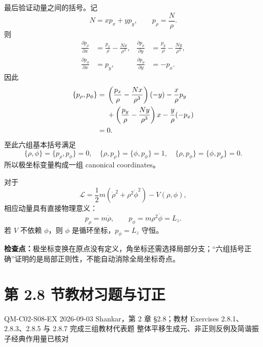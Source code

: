 \begin{checkedsolution}
最后验证动量之间的括号。记
\[
  N=xp_x+yp_y,
  \qquad
  p_\rho=\frac N\rho.
\]
则
\begin{align}
  \frac{\partial p_\rho}{\partial x}
  &=\frac{p_x}{\rho}-\frac{Nx}{\rho^3},
  &
  \frac{\partial p_\rho}{\partial y}
  &=\frac{p_y}{\rho}-\frac{Ny}{\rho^3},
  \label{eq:QM-C02-S07-E02-prho-position-derivatives}\\
  \frac{\partial p_\phi}{\partial x}
  &=p_y,
  &
  \frac{\partial p_\phi}{\partial y}
  &=-p_x.
  \label{eq:QM-C02-S07-E02-pphi-position-derivatives}
\end{align}
因此
\begin{align}
  \{p_\rho,p_\phi\}
  ={}&
  \left(\frac{p_x}{\rho}-\frac{Nx}{\rho^3}\right)(-y)
  -\frac x\rho p_y \notag\\
  &+
  \left(\frac{p_y}{\rho}-\frac{Ny}{\rho^3}\right)x
  -\frac y\rho(-p_x) \notag\\
  ={}&0.
  \label{eq:QM-C02-S07-E02-momentum-bracket}
\end{align}
至此六组基本括号满足
\begin{equation}
  \boxed{
  \{\rho,\phi\}=\{p_\rho,p_\phi\}=0,
  \quad
  \{\rho,p_\rho\}=\{\phi,p_\phi\}=1,
  \quad
  \{\rho,p_\phi\}=\{\phi,p_\rho\}=0.}
  \label{eq:QM-C02-S07-E02-canonical-result}
\end{equation}
所以极坐标变量构成一组 canonical coordinates。

对于
\[
  \mathcal L
  =\frac12m(\dot\rho^2+\rho^2\dot\phi^2)-V(\rho,\phi),
\]
相应动量具有直接物理意义：
\begin{equation}
  p_\rho=m\dot\rho,
  \qquad
  p_\phi=m\rho^2\dot\phi=L_z.
  \label{eq:QM-C02-S07-E02-physical-momenta}
\end{equation}
若 $V$ 不依赖 $\phi$，则 $\phi$ 是循环坐标，$p_\phi=L_z$ 守恒。
\end{checkedsolution}

\textbf{检查点：}极坐标变换在原点没有定义，角坐标还需选择局部分支；“六组括号正确”证明的是局部正则性，不能自动消除全局坐标奇点。

\section{第 2.8 节教材习题与订正}
\label{exercise-set:QM-C02-S08}

\exercisemeta
  {QM-C02-S08-EX}
  {2026-09-03}
  {Shankar，第 2 章 \S 2.8；教材 Exercises 2.8.1、2.8.3、2.8.5 与 2.8.7}
  {完成三组教材代表题}
  {整体平移生成元、非正则反例及简谐振子经典作用量已核对}

